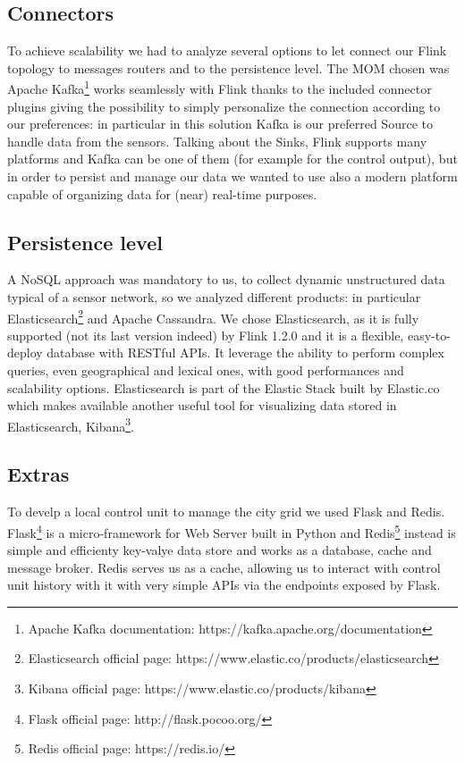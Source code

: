 \subsection{Connectors}
To achieve scalability we had to analyze several options to let connect our Flink topology to messages routers and to the persistence level. The MOM chosen was Apache Kafka\footnote{Apache Kafka documentation: https://kafka.apache.org/documentation} works seamlessly with Flink thanks to the included connector plugins giving the possibility to simply personalize the connection according to our preferences: in particular in this solution Kafka is our preferred Source to handle data from the sensors. Talking about the Sinks, Flink supports many platforms and Kafka can be one of them (for example for the control output), but in order to persist and manage our data we wanted to use also a modern platform capable of organizing data for (near) real-time purposes.

\subsection{Persistence level}
A NoSQL approach was mandatory to us, to collect dynamic unstructured data typical of a sensor network, so we analyzed different products: in particular Elasticsearch\footnote{Elasticsearch official page: https://www.elastic.co/products/elasticsearch} and Apache Cassandra. We chose Elasticsearch, as it is fully supported (not its last version indeed) by Flink 1.2.0 and it is a flexible, easy-to-deploy database with RESTful APIs. It leverage the ability to perform complex queries, even geographical and lexical ones, with good performances and scalability options. Elasticsearch is part of the Elastic Stack built by Elastic.co which makes available another useful tool for visualizing data stored in Elasticsearch, Kibana\footnote{Kibana official page: https://www.elastic.co/products/kibana}.

\subsection{Extras}
To develp a local control unit to manage the city grid we used Flask and Redis. Flask\footnote{Flask official page: http://flask.pocoo.org/} is a micro-framework for Web Server built in Python and Redis\footnote{Redis official page: https://redis.io/} instead is simple and efficienty key-valye data store and works as a database, cache and message broker. Redis serves us as a cache, allowing us to interact with control unit history with it with very simple APIs via the endpoints exposed by Flask.

